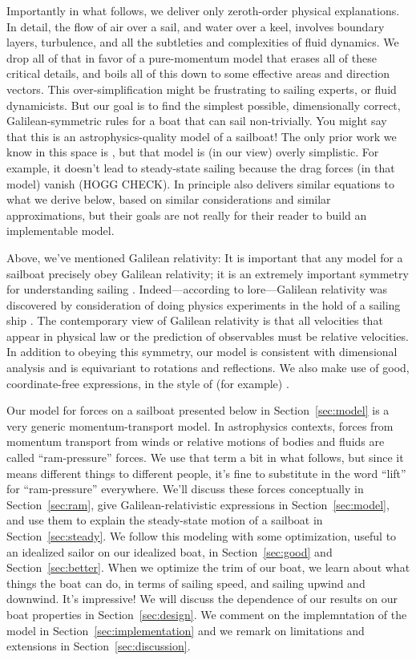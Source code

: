 \documentclass[letterpaper]{article}
\newcommand{\secref}[1]{Section~\ref{#1}}
\begin{document}
Importantly in what follows, we deliver only zeroth-order physical explanations.
In detail, the flow of air over a sail, and water over a keel, involves boundary layers, turbulence, and all the subtleties and complexities of fluid dynamics.
We drop all of that in favor of a pure-momentum model that erases all of these critical details, and boils all of this down to some effective areas and direction vectors.
This over-simplification might be frustrating to sailing experts, or fluid dynamicists.
But our goal is to find the simplest possible, dimensionally correct, Galilean-symmetric rules for a boat that can sail non-trivially.
You might say that this is an astrophysics-quality model of a sailboat!
The only prior work we know in this space is \cite{tao}, but that model is (in our view) overly simplistic.
For example, it doesn't lead to steady-state sailing because the drag forces (in that model) vanish (HOGG CHECK).
In principle also \cite{pos} delivers similar equations to what we derive below, based on similar considerations and similar approximations, but their goals are not really for their reader to build an implementable model.

Above, we've mentioned Galilean relativity:
It is important that any model for a sailboat precisely obey Galilean relativity; it is an extremely important symmetry for understanding sailing \cite{symmetry}.
Indeed---according to lore---Galilean relativity was discovered by consideration of doing physics experiments in the hold of a sailing ship \cite{galileo}.
The contemporary view of Galilean relativity is that all velocities that appear in physical law or the prediction of observables must be relative velocities.
In addition to obeying this symmetry, our model is consistent with dimensional analysis and is equivariant to rotations and reflections.
We also make use of good, coordinate-free expressions, in the style of (for example) \cite{kusse}.

Our model for forces on a sailboat presented below in \secref{sec:model} is a very generic momentum-transport model.
In astrophysics contexts, forces from momentum transport from winds or relative motions of bodies and fluids are called ``ram-pressure'' forces.
We use that term a bit in what follows, but since it means different things to different people, it's fine to substitute in the word ``lift'' for ``ram-pressure'' everywhere.
We'll discuss these forces conceptually in \secref{sec:ram}, give Galilean-relativistic expressions in \secref{sec:model}, and use them to explain the steady-state motion of a sailboat in \secref{sec:steady}.
We follow this modeling with some optimization, useful to an idealized sailor on our idealized boat, in \secref{sec:good} and \secref{sec:better}.
When we optimize the trim of our boat, we learn about what things the boat can do, in terms of sailing speed, and sailing upwind and downwind.
It's impressive!
We will discuss the dependence of our results on our boat properties in \secref{sec:design}.
We comment on the implemntation of the model in \secref{sec:implementation} and we remark on limitations and extensions in \secref{sec:discussion}.
\end{document}
